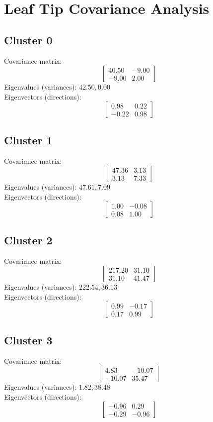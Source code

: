 \documentclass{article}
\begin{document}
\section*{Leaf Tip Covariance Analysis}
\subsection*{Cluster 0}
Covariance matrix:
\[\begin{bmatrix}40.50 & -9.00 \\-9.00 & 2.00\end{bmatrix}\]
Eigenvalues (variances): $ 42.50, $0.00\\
Eigenvectors (directions):
\[\begin{bmatrix}0.98 & 0.22 \\-0.22 & 0.98\end{bmatrix}\]
\subsection*{Cluster 1}
Covariance matrix:
\[\begin{bmatrix}47.36 & 3.13 \\3.13 & 7.33\end{bmatrix}\]
Eigenvalues (variances): $ 47.61, $7.09\\
Eigenvectors (directions):
\[\begin{bmatrix}1.00 & -0.08 \\0.08 & 1.00\end{bmatrix}\]
\subsection*{Cluster 2}
Covariance matrix:
\[\begin{bmatrix}217.20 & 31.10 \\31.10 & 41.47\end{bmatrix}\]
Eigenvalues (variances): $ 222.54, $36.13\\
Eigenvectors (directions):
\[\begin{bmatrix}0.99 & -0.17 \\0.17 & 0.99\end{bmatrix}\]
\subsection*{Cluster 3}
Covariance matrix:
\[\begin{bmatrix}4.83 & -10.07 \\-10.07 & 35.47\end{bmatrix}\]
Eigenvalues (variances): $ 1.82, $38.48\\
Eigenvectors (directions):
\[\begin{bmatrix}-0.96 & 0.29 \\-0.29 & -0.96\end{bmatrix}\]
\end{document}

